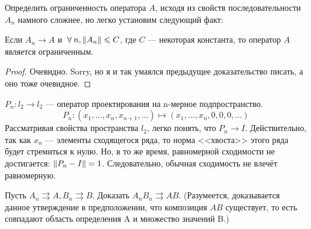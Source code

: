 \documentclass[12pt]{article}
\begin{document}
		Определить ограниченность оператора $A$, исходя из свойств последовательности $A_n$ намного сложнее, но легко 
		установим следующий факт:
		\begin{state}
			Если $A_n \rightarrow A$ и $\forall n, \norm{A_n} \leq C$, где $C$ --- некоторая константа, то 
			оператор $A$ является ограниченным.
		\end{state} 
		\begin{proof}
			Очевидно. {\color{gray}Sorry, но я и так умаялся предыдущее доказательство писать, а оно тоже очевидное.}
		\end{proof}

		\example $P_n : l_2 \rightarrow l_2$ --- оператор проектирования на n-мерное подпространство.
		$$P_n : (x_1, \dots , x_n, x_{n+1}, \dots) \longmapsto (x_1, \dots, x_n, 0, 0, 0, \dots)$$
		Рассматривая свойства пространства $l_2$, легко понять, что $P_n \rightarrow I$. Действительно, так как $x_n$ --- элементы 
		сходящегося ряда, то норма <<хвоста>> этого ряда будет стремиться к нулю.
		Но, в то же время, равномерной сходимости не достигается: $\left\| P_n - I \right\| = 1$. Следовательно, обычная сходимость не влечёт
		равномерную.
	
		\exc Пусть $A_n \rightrightarrows A, B_n \rightrightarrows B$. Доказать $A_n B_n \rightrightarrows A B$. 
		(Разумеется, доказывается данное утверждение в предположении, что композиция $A B$ существует, то есть совпадают область определения
		A и множество значений B.)
	
\end{document}
